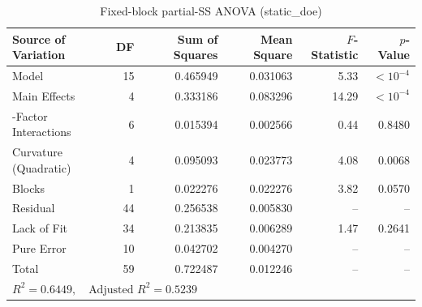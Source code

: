 \begin{table}[htbp]
\centering
\caption{Fixed-block partial-SS ANOVA (static_doe)}
\label{tab:anova_0_static_doe_val_loss}
\begin{tabular}{lrrrrr}
\hline
\textbf{Source of Variation} & \textbf{DF} & \textbf{Sum of Squares} & \textbf{Mean Square} & \textbf{$F$-Statistic} & \textbf{$p$-Value} \\
\hline
Model & 15 & 0.465949 & 0.031063 & 5.33 & $< 10^{-4}$ \\
\quad Main Effects & 4 & 0.333186 & 0.083296 & 14.29 & $< 10^{-4}$ \\
\quad 2-Factor Interactions & 6 & 0.015394 & 0.002566 & 0.44 & 0.8480 \\
\quad Curvature (Quadratic) & 4 & 0.095093 & 0.023773 & 4.08 & 0.0068 \\
\quad Blocks & 1 & 0.022276 & 0.022276 & 3.82 & 0.0570 \\
Residual & 44 & 0.256538 & 0.005830 & -- & -- \\
\quad Lack of Fit & 34 & 0.213835 & 0.006289 & 1.47 & 0.2641 \\
\quad Pure Error & 10 & 0.042702 & 0.004270 & -- & -- \\
Total & 59 & 0.722487 & 0.012246 & -- & -- \\
\hline
\multicolumn{6}{l}{\small $R^2 = 0.6449, \quad \text{Adjusted } R^2 = 0.5239$} \\
\hline
\end{tabular}
\end{table}